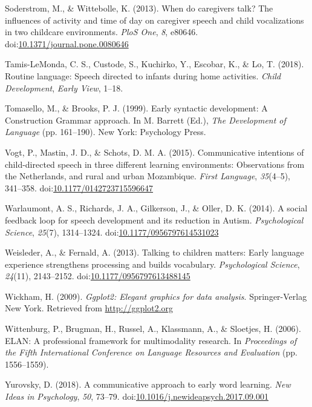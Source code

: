 \documentclass[floatsintext,man]{apa6}
\theoremstyle{definition}
\theoremstyle{definition}
\theoremstyle{definition}
\theoremstyle{remark}
\begin{document}
\hypertarget{ref-soderstrom2013when}{}
Soderstrom, M., \& Wittebolle, K. (2013). When do caregivers talk? The
influences of activity and time of day on caregiver speech and child
vocalizations in two childcare environments. \emph{PloS One}, \emph{8},
e80646.
doi:\href{https://doi.org/10.1371/journal.pone.0080646}{10.1371/journal.pone.0080646}

\hypertarget{ref-tamislemonda2018routine}{}
Tamis-LeMonda, C. S., Custode, S., Kuchirko, Y., Escobar, K., \& Lo, T.
(2018). Routine language: Speech directed to infants during home
activities. \emph{Child Development}, \emph{Early View}, 1--18.

\hypertarget{ref-tomasello1999early}{}
Tomasello, M., \& Brooks, P. J. (1999). Early syntactic development: A
Construction Grammar approach. In M. Barrett (Ed.), \emph{The
Development of Language} (pp. 161--190). New York: Psychology Press.

\hypertarget{ref-vogt2015communicative}{}
Vogt, P., Mastin, J. D., \& Schots, D. M. A. (2015). Communicative
intentions of child-directed speech in three different learning
environments: Observations from the Netherlands, and rural and urban
Mozambique. \emph{First Language}, \emph{35}(4--5), 341--358.
doi:\href{https://doi.org/10.1177/0142723715596647}{10.1177/0142723715596647}

\hypertarget{ref-warlaumont2014social}{}
Warlaumont, A. S., Richards, J. A., Gilkerson, J., \& Oller, D. K.
(2014). A social feedback loop for speech development and its reduction
in Autism. \emph{Psychological Science}, \emph{25}(7), 1314--1324.
doi:\href{https://doi.org/10.1177/0956797614531023}{10.1177/0956797614531023}

\hypertarget{ref-weisleder2013talking}{}
Weisleder, A., \& Fernald, A. (2013). Talking to children matters: Early
language experience strengthens processing and builds vocabulary.
\emph{Psychological Science}, \emph{24}(11), 2143--2152.
doi:\href{https://doi.org/10.1177/0956797613488145}{10.1177/0956797613488145}

\hypertarget{ref-R-ggplot2}{}
Wickham, H. (2009). \emph{Ggplot2: Elegant graphics for data analysis}.
Springer-Verlag New York. Retrieved from \url{http://ggplot2.org}

\hypertarget{ref-ELAN}{}
Wittenburg, P., Brugman, H., Russel, A., Klassmann, A., \& Sloetjes, H.
(2006). ELAN: A professional framework for multimodality research. In
\emph{Proceedings of the Fifth International Conference on Language
Resources and Evaluation} (pp. 1556--1559).

\hypertarget{ref-yurovsky2018communicative}{}
Yurovsky, D. (2018). A communicative approach to early word learning.
\emph{New Ideas in Psychology}, \emph{50}, 73--79.
doi:\href{https://doi.org/10.1016/j.newideapsych.2017.09.001}{10.1016/j.newideapsych.2017.09.001}

\endgroup
\end{document}
